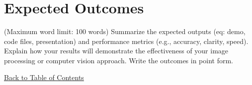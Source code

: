 \section{Expected Outcomes}
(Maximum word limit: 100 words)
Summarize the expected outputs (eq: demo, code files, presentation) and performance metrics (e.g., accuracy, clarity, speed).  
Explain how your results will demonstrate the effectiveness of your image processing or computer vision approach. Write the outcomes in point form.

\hyperref[contents]{\small Back to Table of Contents}
\newpage
